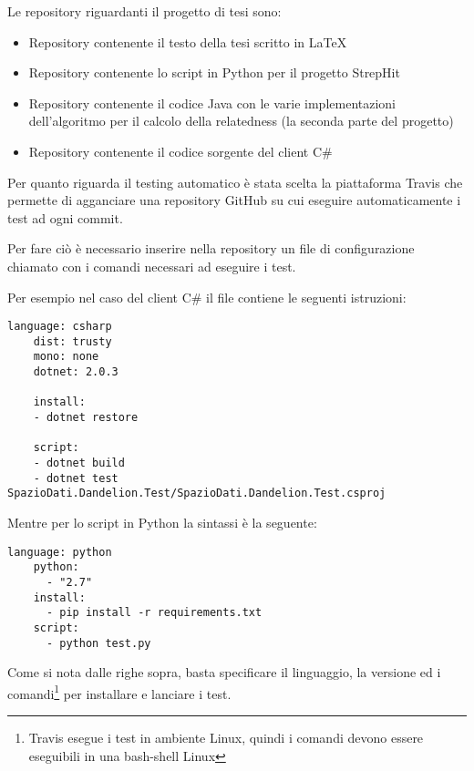 Le repository riguardanti il progetto di tesi sono:

\begin{itemize}
    \item Repository contenente il testo della tesi scritto in \LaTeX\cite{latex-repo}\\
    \item Repository contenente lo script in Python per il progetto StrepHit\cite{strephit-repo}\\
    \item Repository contenente il codice Java con le varie implementazioni dell'algoritmo per il calcolo della relatedness (la seconda parte del progetto)\cite{dandelion-repo}\\
    \item Repository contenente il codice sorgente del client C$\#$\cite{client-repo} \\
\end{itemize} 

Per quanto riguarda il testing automatico è stata scelta la piattaforma Travis che permette di agganciare una repository GitHub su cui eseguire automaticamente i test 
ad ogni commit. 

Per fare ciò è necessario inserire nella repository un file di configurazione chiamato  con i comandi necessari ad eseguire i test. 

Per esempio nel caso del client C$\#$ il file  contiene le seguenti istruzioni:

\begin{lstlisting}[style=YmlStyle, caption=File configurazione travis.yml per progetti C$\#$]
    language: csharp
    dist: trusty
    mono: none
    dotnet: 2.0.3

    install:
    - dotnet restore

    script:
    - dotnet build
    - dotnet test SpazioDati.Dandelion.Test/SpazioDati.Dandelion.Test.csproj
\end{lstlisting}

Mentre per lo script in Python la sintassi è la seguente:
\begin{lstlisting}[style=YmlStyle, caption=File configurazione travis.yml per progetti Python]
    language: python
    python: 
      - "2.7"
    install:
      - pip install -r requirements.txt
    script:
      - python test.py
\end{lstlisting}

Come si nota dalle righe sopra, basta specificare il linguaggio, la versione ed i comandi\footnote{
    Travis esegue i test in ambiente Linux, quindi i comandi devono essere eseguibili in una bash-shell Linux
}
per installare e lanciare i test.

